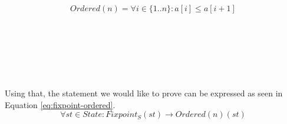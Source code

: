 \begin{equation}
  \label{eq:ordered}
  Ordered(n) = \forall i \in \{1..n\} : a[i] \leq a[i + 1]
\end{equation}

\begin{code}
    \>[0]\AgdaSpace{}%
    \AgdaSymbol{:}\AgdaSpace{}%
    \AgdaSpace{}%
    \AgdaSpace{}%
    \<%
    \\
    \>[0]\AgdaSpace{}%
    \AgdaSpace{}%
    \AgdaSymbol{=}\AgdaSpace{}%
    \AgdaSpace{}%
    \AgdaSymbol{(}\AgdaOperator{\AgdaFunction{v[}}\AgdaSpace{}%
    \AgdaSpace{}%
    \AgdaOperator{\AgdaFunction{]}}\AgdaSpace{}%
    \AgdaOperator{\AgdaFunction{g[}}\AgdaSpace{}%
    \AgdaSpace{}%
    \AgdaSpace{}%
    \AgdaOperator{\AgdaFunction{]}}\AgdaSymbol{)}\AgdaSpace{}%
    \AgdaSymbol{(}\AgdaOperator{\AgdaFunction{v[}}\AgdaSpace{}%
    \AgdaSpace{}%
    \AgdaOperator{\AgdaFunction{]}}\AgdaSpace{}%
    \AgdaOperator{\AgdaFunction{g[}}\AgdaSpace{}%
    \AgdaSpace{}%
    \AgdaSymbol{(}\AgdaSpace{}%
    \AgdaSymbol{)}\AgdaSpace{}%
    \AgdaOperator{\AgdaFunction{]}}\AgdaSymbol{)}\<%
    \\
    \\[\AgdaEmptyExtraSkip]%
    \>[0]\AgdaSpace{}%
    \AgdaSymbol{:}\AgdaSpace{}%
    \AgdaSpace{}%
    \AgdaSpace{}%
    \<%
    \\
    \>[0]\AgdaSpace{}%
    \AgdaSpace{}%
    \AgdaSymbol{=}\AgdaSpace{}%
    \<%
    \\
    \>[0]\AgdaSpace{}%
    \AgdaSymbol{(}\AgdaSpace{}%
    \AgdaSymbol{)}\AgdaSpace{}%
    \AgdaSymbol{=}\AgdaSpace{}%
    \AgdaSpace{}%
    \AgdaSpace{}%
    \AgdaSpace{}%
    \AgdaSymbol{(}\AgdaSpace{}%
    \AgdaSymbol{)}\<%
\end{code}

Using that, the statement we would like to prove can be expressed as seen in Equation \ref{eq:fixpoint-ordered}.
\begin{equation}
  \label{eq:fixpoint-ordered}
  \forall st \in State : Fixpoint_{S}(st) \to Ordered(n)(st)
\end{equation}

